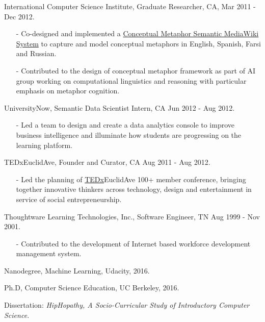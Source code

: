 \documentclass[11pt,article,oneside]{memoir}
\begin{document}
\ind International Computer Science Institute, Graduate Researcher, CA, Mar 2011 - Dec 2012.
\begin{itemize}[noitemsep,nolistsep]
\item[-] Co-designed and implemented a \href{http://metaphor.icsi.berkeley.edu}{Conceptual Metaphor Semantic MediaWiki System} to capture and model conceptual metaphors in English, Spanish, Farsi and Russian. 
\item[-] Contributed to the design of conceptual metaphor framework as part of AI group working on computational linguistics and reasoning with particular emphasis on metaphor cognition.
\end{itemize} 

\ind UniversityNow, Semantic Data Scientist Intern, CA Jun 2012 - Aug 2012.
\begin{itemize}[noitemsep,nolistsep]
\item[-]Led a team to design and create a data analytics console to improve business intelligence and illuminate how students are progressing on the learning platform.
\end{itemize} 

\ind TEDxEuclidAve, Founder and Curator, CA Aug 2011 - Aug 2012.
\begin{itemize}[noitemsep,nolistsep]
\item[-]Led the planning of \href{http://www.ted.com/tedx/events/3790}{TEDx}EuclidAve 100+ member conference, bringing together innovative thinkers across technology, design and entertainment in service of social entrepreneurship.
\end{itemize} 

\ind Thoughtware Learning Technologies, Inc., Software Engineer, TN Aug 1999 - Nov 2001.
\begin{itemize}[noitemsep,nolistsep]
\item[-]Contributed to the development of Internet based workforce development management system.
\end{itemize} 

\bigskip 



\ind Nanodegree, Machine Learning, Udacity, 2016.\vspace{0.05in}

\ind Ph.D, Computer Science Education, UC Berkeley, 2016.

\ind \hspace{0.35in} \footnotesize Dissertation: \emph{HipHopathy, A Socio-Curricular Study of Introductory Computer Science.} \normalsize \vspace{0.05in}
\end{document}
